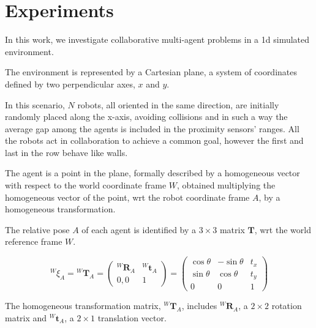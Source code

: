 \chapter{Experiments}
\label{chap:experiments}


In this work, we investigate collaborative multi-agent problems in a \gls{1d} 
simulated environment.

The environment is represented by a Cartesian plane, a system of coordinates
defined by two perpendicular axes, $x$ and $y$. 

In this scenario, $N$ robots, all oriented in the same direction, are initially 
randomly placed along the x-axis, avoiding collisions and in such a way the 
average gap among the agents is included in the proximity sensors' ranges. 
All the robots act in collaboration to achieve a common goal, however the first 
and last in the row behave like walls. %

The agent is a point in the plane, formally described by a homogeneous vector 
with respect to the world coordinate frame $W$, obtained multiplying the 
homogeneous vector of the point, \gls{wrt}  the robot coordinate frame 
$A$, by a homogeneous transformation. 

The relative pose $A$ of each agent is identified by a $3 \times 3$ matrix 
$\mathbf{T}$, \gls{wrt} the world reference frame $W$. 

\begin{Equation}[!htb]
	\centering
	\begin{equation}
	\label{eq:homogeneous transformation matrix}
	{^W\!\xi_A} = {^W\!\mathbf{T}_A} 
	=
	\begin{pmatrix}
	^W\!\mathbf{R}_A & ^W\!\mathbf{t}_A\\
	0, 0 & 1
	\end{pmatrix}
	=
	\begin{pmatrix}
	\cos \theta & - \sin \theta & t_x\\
	\sin \theta & \cos \theta & t_y\\
	0 & 0 & 1
	\end{pmatrix}
	\end{equation}
	\caption[Homogeneous Transformation Matrix]{The homogeneous 
	transformation matrix, 	$^W\!\mathbf{T}_A$, includes $^W\!\mathbf{R}_A$, a 
	$2 \times 2$ rotation matrix and $^W\!\mathbf{t}_A$, a $2 \times 1$ 
	translation vector.}
	\label{eq:hommatrix}
\end{Equation}

